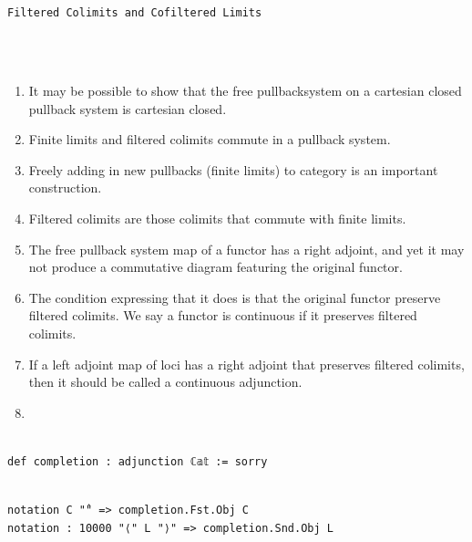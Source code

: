 \documentclass{book}
\theoremstyle{definition}
\newcounter{lcounter}
\renewcommand{\chapter}[1]{
\newpage
{
\Huge 
\begin{center}
\ \\
\ \\
\thispagestyle{empty}
\texttt{#1}
\end{center}}
\ \\
\ \\
}
\begin{document}
\chapter{Filtered Colimits and Cofiltered Limits}

\begin{enumerate}
\item It may be possible to show that the free pullbacksystem on a cartesian closed pullback system is cartesian closed.
\item Finite limits and filtered colimits commute in a pullback system.
\item Freely adding in new pullbacks (finite limits) to category is an important construction.
\item Filtered colimits are those colimits that commute with finite limits.
\item The free pullback system map of a functor has a right adjoint, and yet it may not produce a commutative diagram featuring the original functor. 
\item The condition expressing that it does is that the original functor preserve filtered colimits. We say a functor is continuous if it preserves filtered colimits.
\item If a left adjoint map of loci has a right adjoint that preserves filtered colimits, then it should be called a continuous adjunction.
\item 
\end{enumerate}

\begin{center}
\begin{tcolorbox}[width=5in,colback={white},title={\begin{center}\texttt{Lean \thelcounter} \addtocounter{lcounter}{1}  \end{center}},colbacktitle=Blue,coltitle=black]
\begin{verbatim}

def completion : adjunction ℂ𝕒𝕥 := sorry

\end{verbatim}
\end{tcolorbox}
\end{center}

\begin{center}
\begin{tcolorbox}[width=5in,colback={white},title={\begin{center}\texttt{Lean \thelcounter} \addtocounter{lcounter}{1}  \end{center}},colbacktitle=Blue,coltitle=black]
\begin{verbatim}

notation C "̂" => completion.Fst.Obj C
notation : 10000 "⟨" L "⟩" => completion.Snd.Obj L

\end{verbatim}
\end{tcolorbox}
\end{center}
\end{document}
